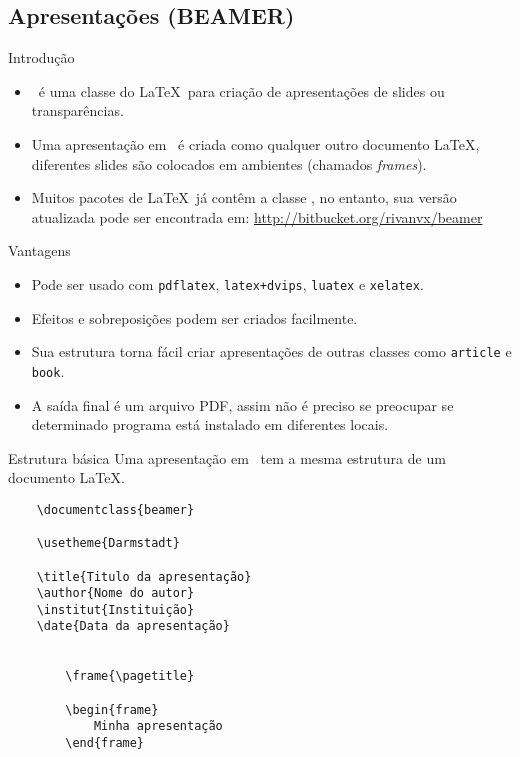 \subsection{Apresentações (BEAMER)}

\begin{frame}[fragile]{Introdução}
    \begin{itemize}
    \item \beamer\ é uma classe do \LaTeX\ para criação de apresentações de slides ou transparências.
    \item Uma apresentação em \beamer\ é criada como qualquer outro documento \LaTeX, diferentes slides são colocados em ambientes (chamados \textit{frames}).
    \item Muitos pacotes de \LaTeX\ já contêm a classe \beamer, no entanto, sua versão atualizada pode ser encontrada em: \url{http://bitbucket.org/rivanvx/beamer}
    \end{itemize}
\end{frame}

\begin{frame}[fragile]{Vantagens}
    \begin{itemize}
    \item Pode ser usado com \verb|pdflatex|, \verb|latex+dvips|, \verb|luatex| e \verb|xelatex|.
    \item Efeitos e sobreposições podem ser criados facilmente.
    \item Sua estrutura torna fácil criar apresentações de outras classes como \verb|article| e \verb|book|.
    \item A saída final é um arquivo PDF, assim não é preciso se preocupar se determinado programa está instalado em diferentes locais.
    \end{itemize}
\end{frame}

\begin{frame}[fragile]{Estrutura básica}
    Uma apresentação em \beamer\ tem a mesma estrutura de um documento \LaTeX.
    
{\footnotesize
\begin{verbatim}
    \documentclass{beamer}

    \usetheme{Darmstadt}

    \title{Titulo da apresentação}
    \author{Nome do autor}
    \institut{Instituição}
    \date{Data da apresentação}

    
        \frame{\pagetitle}

        \begin{frame}
            Minha apresentação
        \end{frame}
    
\end{verbatim}
}
\end{frame}


